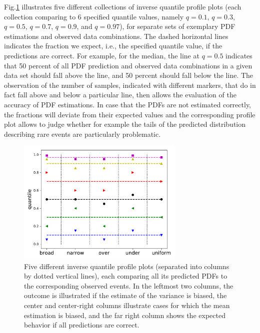 \documentclass[BCOR=1mm, DIV=calc,10pt,
twoside=true,
twocolumn,
headings=normal]{scrartcl}
\newcommand{\fig}{Fig.}
\begin{document}
\fig \ref{fig:invquant_example} illustrates five different collections of inverse quantile profile plots (each collection comparing to 6 specified quantile values, namely $q = 0.1$, $q = 0.3$, $q = 0.5$, $q = 0.7$, $q = 0.9$, and $q = 0.97$), for separate sets of exemplary PDF estimations and observed data combinations. The dashed horizontal lines indicates the fraction we expect, i.e., the specified quantile value, if the predictions are correct. For example, for the median, the line at $q = 0.5$ indicates that  50 percent of all PDF prediction and observed data combinations in a given data set should fall above the line, and 50 percent should fall below the line. The observation of the number of samples, indicated with different markers, that do in fact fall above and below a particular line, then allows the evaluation of the accuracy of PDF estimations. In case that the PDFs are not estimated correctly, the fractions will deviate from their expected values and the corresponding profile plot allows to judge whether for example the tails of the predicted distribution describing rare events are particularly problematic.

\begin{figure}
\begin{center}
\includegraphics[width=8cm]{../figures/invquant_example}
\caption{\label{fig:invquant_example} Five different inverse quantile profile plots (separated into columns by dotted vertical lines), each comparing all its predicted PDFs to the corresponding observed events. In the leftmost two columns, the outcome is illustrated if the estimate of the variance is biased, the center and center-right columns illustrate cases for which the mean estimation is biased, and the far right column shows the expected behavior if all predictions are correct.}
\end{center}
\end{figure}
\end{document}
